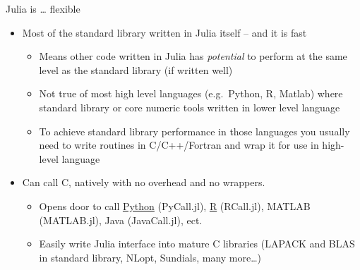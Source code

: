 \documentclass[compress,10pt]{beamer}
\begin{document}
\begin{frame}{Julia is \ldots{} flexible}

\begin{itemize}[<+->]
\itemsep1pt\parskip0pt
\item
  Most of the standard library written in Julia itself -- and it is fast

  \begin{itemize}[<+->]
  \itemsep1pt\parskip0pt
  \item
    Means other code written in Julia has \emph{potential} to perform at
    the same level as the standard library (if written well)
  \item
    Not true of most high level languages (e.g.~Python, R, Matlab) where
    standard library or core numeric tools written in lower level
    language
  \item
    To achieve standard library performance in those languages you
    usually need to write routines in C/C++/Fortran and wrap it for use
    in high-level language
  \end{itemize}
\item
  Can call C, natively with no overhead and no wrappers.

  \begin{itemize}[<+->]
  \itemsep1pt\parskip0pt
  \item
    Opens door to call
    \href{http://localhost:8888/notebooks/PyCall.ipynb}{Python}
    (PyCall.jl), \href{http://localhost:8888/notebooks/rcall.ipynb}{R}
    (RCall.jl), MATLAB (MATLAB.jl), Java (JavaCall.jl), ect.
  \item
    Easily write Julia interface into mature C libraries (LAPACK and
    BLAS in standard library, NLopt, Sundials, many more\ldots{})
  \end{itemize}
\end{itemize}

\end{frame}
\end{document}
